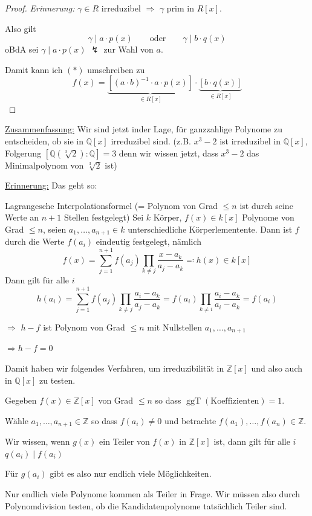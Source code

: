 \documentclass[12pt,parskip=full]{scrartcl}
\newcommand{\setZ}{\mathbb{Z}}
\newcommand{\setQ}{\mathbb{Q}}
\newcommand{\heading}{\underline}
\theoremstyle{definition}
\theoremstyle{remark}
\begin{document}
\begin{proof}
		\textit{Erinnerung:} $\gamma \in R$ irreduzibel $\Rightarrow$ $\gamma$ prim in $R[x]$.
		
		Also gilt
		\begin{equation*}
			\gamma \mid a \cdot p(x) \qquad\text{oder}\qquad \gamma \mid b \cdot q(x)
		\end{equation*}
		oBdA sei $\gamma \mid a \cdot p(x)$ $\lightning$ zur Wahl von $a$.
		
		Damit kann ich $(*)$ umschreiben zu
		\begin{equation*}
			f(x) = \underbrace{\left[ (a \cdot b)^{-1} \cdot a \cdot p(x) \right]}_{\in R[x]} \cdot \underbrace{\left[ b \cdot q(x) \right]}_{\in R[x]}
		\end{equation*}
	\end{proof}

	\heading{Zusammenfassung:} Wir sind jetzt inder Lage, für ganzzahlige Polynome zu entscheiden, ob sie in $\setQ[x]$ irreduzibel sind. (z.B. $x^3 - 2$ ist irreduzibel in $\setQ[x]$, Folgerung $[\setQ(\sqrt[3]{2}): \setQ] = 3$ denn wir wissen jetzt, dass $x^3 - 2$ das Minimalpolynom von $\sqrt[3]{2}$ ist)
	
	\heading{Erinnerung:} Das geht so:
	
	Lagrangesche Interpolationsformel (= Polynom von Grad $\leq n$ ist durch seine Werte an $n+1$ Stellen festgelegt) Sei $k$ Körper, $f(x) \in k[x]$ Polynome von Grad $\leq n$, seien $a_1, \dots, a_{n+1} \in k$ unterschiedliche Körperlementente. Dann ist $f$ durch die Werte $f(a_i)$ eindeutig festgelegt, nämlich
	\begin{equation*}
		f(x) = \sum_{j=1}^{n+1} f(a_j) \prod_{k \neq j} \frac{x - a_k}{a_j - a_k} \eqqcolon h(x) \in k[x]
	\end{equation*}
	Dann gilt für alle $i$
	\begin{equation*}
		h(a_i) = \sum_{j = 1}^{n+1} f(a_j) \prod_{k \neq j} \frac{a_i - a_k}{a_j - a_k} = f(a_i) \prod_{k \neq i} \frac{a_i - a_k}{a_i - a_k} = f(a_i)
	\end{equation*}
	
	$\Rightarrow$ $h-f$ ist Polynom von Grad $\leq n$ mit Nullstellen $a_1, \dots, a_{n+1}$
	
	$\Rightarrow h - f = 0$
	
	Damit haben wir folgendes Verfahren, um irreduzibilität in $\setZ[x]$ und also auch in $\setQ[x]$ zu testen.
	
	Gegeben $f(x) \in \setZ[x]$ von Grad $\leq n$ so dass $\operatorname{ggT}(\text{Koeffizienten}) = 1$.
	
	Wähle $a_1, \dots, a_{n+1} \in \setZ$ so dass $f(a_i) \neq 0$ und betrachte $f(a_1), \dots, f(a_n) \in \setZ$.
	
	Wir wissen, wenn $g(x)$ ein Teiler von $f(x)$ in $\setZ[x]$ ist, dann gilt für alle $i$ $q(a_i) \mid f(a_i)$
	
	Für $g(a_i)$ gibt es also nur endlich viele Möglichkeiten.
	
	Nur endlich viele Polynome kommen als Teiler in Frage. Wir müssen also durch Polynomdivision testen, ob die Kandidatenpolynome tatsächlich Teiler sind.
\end{document}
